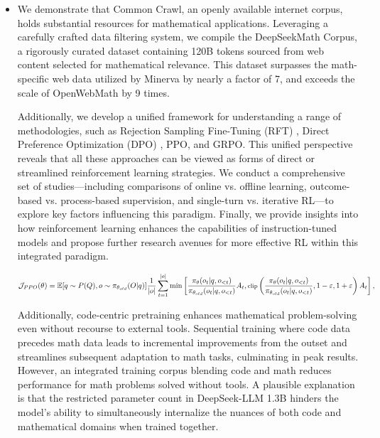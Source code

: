 \begin{itemize}[topsep=0pt]
    \item We demonstrate that Common Crawl, an openly available internet corpus, holds substantial resources for mathematical applications. Leveraging a carefully crafted data filtering system, we compile the DeepSeekMath Corpus, a rigorously curated dataset containing 120B tokens sourced from web content selected for mathematical relevance. This dataset surpasses the math-specific web data utilized by Minerva \citep{minerva} by nearly a factor of 7, and exceeds the scale of OpenWebMath \citep{openwebmath} by 9 times.

Additionally, we develop a unified framework for understanding a range of methodologies, such as Rejection Sampling Fine-Tuning (RFT) \citep{yuan2023scaling}, Direct Preference Optimization (DPO) \citep{dpo}, PPO, and GRPO. This unified perspective reveals that all these approaches can be viewed as forms of direct or streamlined reinforcement learning strategies. We conduct a comprehensive set of studies—including comparisons of online vs. offline learning, outcome-based vs. process-based supervision, and single-turn vs. iterative RL—to explore key factors influencing this paradigm. Finally, we provide insights into how reinforcement learning enhances the capabilities of instruction-tuned models and propose further research avenues for more effective RL within this integrated paradigm.

\begin{equation}
\footnotesize
            \mathcal{J}_{PPO}(\theta) = \mathbb{E}{[q \sim P(Q), o \sim \pi_{\theta_{old}}(O|q)]} \frac{1}{|o|} \sum_{t=1}^{|o|} \min \left[ \frac{\pi_\theta(o_{t} | q, o_{<t})}{\pi_{\theta_{old}}(o_{t} | q, o_{<t})} A_{t}, \text{clip} \left( \frac{\pi_\theta(o_{t} | q, o_{<t})}{\pi_{\theta_{old}}(o_{t} | q, o_{<t})}, 1 - \varepsilon, 1 + \varepsilon \right)  A_{t} \right] ,
\end{equation}

Additionally, code-centric pretraining enhances mathematical problem-solving even without recourse to external tools. Sequential training where code data precedes math data leads to incremental improvements from the outset and streamlines subsequent adaptation to math tasks, culminating in peak results. However, an integrated training corpus blending code and math reduces performance for math problems solved without tools. A plausible explanation is that the restricted parameter count in DeepSeek-LLM 1.3B hinders the model’s ability to simultaneously internalize the nuances of both code and mathematical domains when trained together.


\end{itemize}
